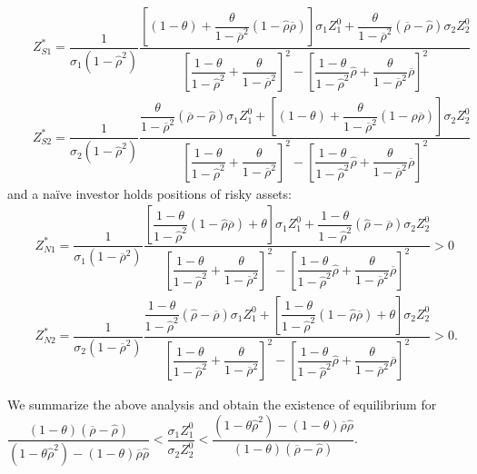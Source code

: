 \documentclass[10pt]{article}
\begin{document}
\begin{eqnarray}
& & Z_{S 1}^* = \dfrac1{\sigma_1 (1 - {\hat \rho}^2)} \dfrac{\left[ (1 - \theta) + \dfrac{\theta}{1 - \overline{\rho}^2} (1 - {\hat \rho} \overline{\rho}) \right] \sigma_1 Z_1^0 + \dfrac{\theta}{1 - \overline{\rho}^2} (\overline{\rho} - {\hat \rho}) \sigma_2 Z_2^0}{\left[ \dfrac{1 - \theta}{1 - {\hat \rho}^2} + \dfrac{\theta}{1 - \overline{\rho}^2} \right]^2 - \left[ \dfrac{1 - \theta}{1 - {\hat \rho}^2} {\hat \rho} + \dfrac{\theta}{1 - \overline{\rho}^2} \overline{\rho} \right]^2} \\
& & Z_{S 2}^* = \dfrac1{\sigma_2 (1 - {\hat \rho}^2)} \dfrac{\dfrac{\theta}{1 - \overline{\rho}^2} (\overline{\rho} - {\hat \rho}) \sigma_1 Z_1^0 + \left[ (1 - \theta) + \dfrac{\theta}{1 - \overline{\rho}^2} (1 - {\hat \rho} \overline{\rho}) \right] \sigma_2 Z_2^0}{\left[ \dfrac{1 - \theta}{1 - {\hat \rho}^2} + \dfrac{\theta}{1 - \overline{\rho}^2} \right]^2 - \left[ \dfrac{1 - \theta}{1 - {\hat \rho}^2} {\hat \rho} + \dfrac{\theta}{1 - \overline{\rho}^2} \overline{\rho} \right]^2}
\end{eqnarray}
and a na\"ive investor holds positions of risky assets:
\begin{eqnarray}
& & Z_{N 1}^* = \dfrac1{\sigma_1 (1 - \overline{\rho}^2)} \dfrac{\left[ \dfrac{1 - \theta}{1 - {\hat \rho}^2} (1 - {\hat \rho} \overline{\rho}) + \theta \right] \sigma_1 Z_1^0 + \dfrac{1 - \theta}{1 - {\hat \rho}^2} ({\hat \rho} - \overline{\rho}) \sigma_2 Z_2^0}{\left[ \dfrac{1 - \theta}{1 - {\hat \rho}^2} + \dfrac{\theta}{1 - \overline{\rho}^2} \right]^2 - \left[ \dfrac{1 - \theta}{1 - {\hat \rho}^2} {\hat \rho} + \dfrac{\theta}{1 - \overline{\rho}^2} \overline{\rho} \right]^2} > 0 \\
& & Z_{N 2}^* = \dfrac1{\sigma_2 (1 - \overline{\rho}^2)} \dfrac{\dfrac{1 - \theta}{1 - {\hat \rho}^2} ({\hat \rho} - \overline{\rho}) \sigma_1 Z_1^0 + \left[ \dfrac{1 - \theta}{1 - {\hat \rho}^2} (1 - {\hat \rho} \overline{\rho}) + \theta \right] \sigma_2 Z_2^0}{\left[ \dfrac{1 - \theta}{1 - {\hat \rho}^2} + \dfrac{\theta}{1 - \overline{\rho}^2} \right]^2 - \left[ \dfrac{1 - \theta}{1 - {\hat \rho}^2} {\hat \rho} + \dfrac{\theta}{1 - \overline{\rho}^2} \overline{\rho} \right]^2} > 0.
\end{eqnarray}

We summarize the above analysis and obtain the existence of equilibrium for $ \dfrac{(1 - \theta) (\overline{\rho} - {\hat \rho})}{(1 - \theta {\hat \rho}^2) - (1 - \theta) \overline{\rho} {\hat \rho}} < \dfrac{\sigma_1 Z_1^0}{\sigma_2 Z_2^0} < \dfrac{(1 - \theta {\hat \rho}^2) - (1 - \theta) \overline{\rho} {\hat \rho}}{(1 - \theta) (\overline{\rho} - {\hat \rho})} $.
\end{document}
